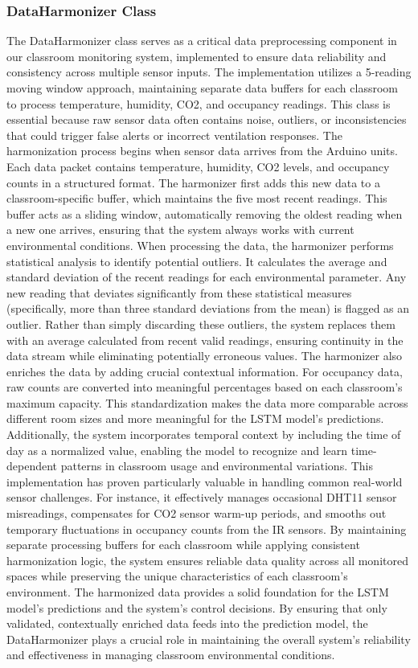 \subsubsection{DataHarmonizer Class}
The DataHarmonizer class serves as a critical data preprocessing component in our classroom monitoring system, implemented to ensure data reliability and consistency across multiple sensor inputs. The implementation utilizes a 5-reading moving window approach, maintaining separate data buffers for each classroom to process temperature, humidity, CO2, and occupancy readings. This class is essential because raw sensor data often contains noise, outliers, or inconsistencies that could trigger false alerts or incorrect ventilation responses. The harmonization process begins when sensor data arrives from the Arduino units. Each data packet contains temperature, humidity, CO2 levels, and occupancy counts in a structured format. The harmonizer first adds this new data to a classroom-specific buffer, which maintains the five most recent readings. This buffer acts as a sliding window, automatically removing the oldest reading when a new one arrives, ensuring that the system always works with current environmental conditions. When processing the data, the harmonizer performs statistical analysis to identify potential outliers. It calculates the average and standard deviation of the recent readings for each environmental parameter. Any new reading that deviates significantly from these statistical measures (specifically, more than three standard deviations from the mean) is flagged as an outlier. Rather than simply discarding these outliers, the system replaces them with an average calculated from recent valid readings, ensuring continuity in the data stream while eliminating potentially erroneous values. The harmonizer also enriches the data by adding crucial contextual information. For occupancy data, raw counts are converted into meaningful percentages based on each classroom's maximum capacity. This standardization makes the data more comparable across different room sizes and more meaningful for the LSTM model's predictions. Additionally, the system incorporates temporal context by including the time of day as a normalized value, enabling the model to recognize and learn time-dependent patterns in classroom usage and environmental variations. This implementation has proven particularly valuable in handling common real-world sensor challenges. For instance, it effectively manages occasional DHT11 sensor misreadings, compensates for CO2 sensor warm-up periods, and smooths out temporary fluctuations in occupancy counts from the IR sensors. By maintaining separate processing buffers for each classroom while applying consistent harmonization logic, the system ensures reliable data quality across all monitored spaces while preserving the unique characteristics of each classroom's environment. The harmonized data provides a solid foundation for the LSTM model's predictions and the system's control decisions. By ensuring that only validated, contextually enriched data feeds into the prediction model, the DataHarmonizer plays a crucial role in maintaining the overall system's reliability and effectiveness in managing classroom environmental conditions.
